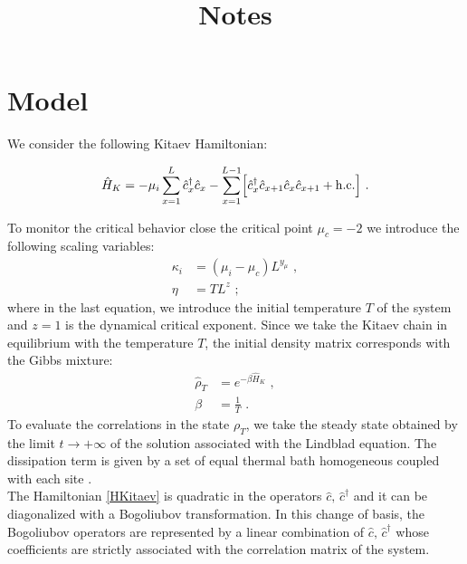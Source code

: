 \documentclass[pra,twocolumn,preprintnumbers,amsmath,amssymb,nofootinbib,floatfix,longbibliography]{revtex4}
\begin{document}
\title{Notes}

\author{}
\affiliation{}


\begin{abstract}
\end{abstract}
\maketitle

\section{Model}

We consider the following Kitaev Hamiltonian:

\begin{equation}
	\label{HKitaev}
	\hat H_K =-\mu_i \sum_{x=1}^L \hat c_x^\dagger \hat c_x
    -\sum _{x=1}^{L-1} \Bigr[\hat c_x^\dagger \hat c_{x+1}
	\hat c_x \hat c_{x+1} + {\rm h.c.} \Bigr]  \,\,.
\end{equation}

To monitor the critical behavior close the critical point
$\mu_c = -2$ we introduce the following scaling variables:
\begin{align}
	\label{scalvar}
	\kappa_i & = (\mu_i - \mu_c) L^{y_{\mu}} \,\,, \\
	\eta & = T L^{z} \,\,;
\end{align}
where in the last equation, we introduce the initial
temperature $T$ of the system and $z=1$ is the dynamical
critical exponent. Since we take the Kitaev chain in
equilibrium with the temperature $T$, the initial density
matrix corresponds with the Gibbs mixture:
\begin{align}
	\label{Gibbs}
	\hat \rho_T & = e^{-\beta \hat H_K} \,\,,\\
	\beta & = \frac{1}{T} \,\,.
\end{align}
To evaluate the correlations in the state $\rho_T$, we take
the steady state obtained by the limit $t \to +\infty$ of
the solution associated with the Lindblad equation.
The dissipation term is given by a set of equal thermal
bath homogeneous coupled with each site
\cite{P-2022-otto}.\\

The Hamiltonian \ref{HKitaev} is quadratic in the operators
$\hat c,\,\hat c^\dagger$ and it can be diagonalized with a 
Bogoliubov transformation. In this change of basis, the 
Bogoliubov operators are represented by a linear combination
of $\hat c,\,\hat c^\dagger$ whose coefficients are strictly
associated with the correlation matrix of the system.  
\end{document}

